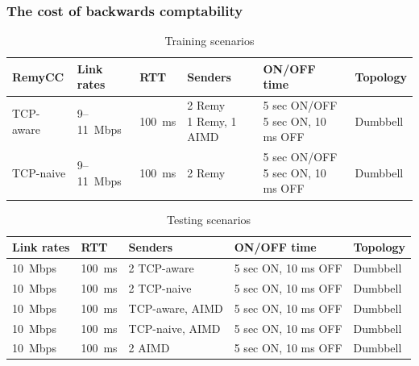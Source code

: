 \begin{frame}
\frametitle{The cost of backwards comptability}
\begin{table}
\begin{center}
\begin{tiny}
\begin{tabular}{l|l|l|l|l|l}
\bf RemyCC & \bf Link rates & \bf RTT & \bf Senders & ON/OFF time & Topology \\
\hline
TCP-aware  & 9--11~Mbps & 100~ms & \pbox{2.5cm}{2 Remy \\ 1 Remy, 1 AIMD}  & \pbox{2.5cm}{5 sec ON/OFF \\ 5 sec ON, 10 ms OFF} & Dumbbell\\
\hline
TCP-naive  & 9--11~Mbps & 100~ms & 2 Remy  & \pbox{2.5cm}{5 sec ON/OFF \\ 5 sec ON, 10 ms OFF} & Dumbbell\\
\hline
\end{tabular}
\end{tiny}
\caption{Training scenarios}
\label{table:oprange}
\end{center}
\end{table}

\begin{table}
\begin{center}
\begin{tiny}
\begin{tabular}{l|l|l|l|l}
\bf Link rates & \bf RTT & \bf Senders & ON/OFF time & Topology \\
\hline
10~Mbps & 100~ms & 2 TCP-aware & 5 sec ON, 10 ms OFF & Dumbbell\\
10~Mbps & 100~ms & 2 TCP-naive & 5 sec ON, 10 ms OFF & Dumbbell\\
10~Mbps & 100~ms & TCP-aware, AIMD & 5 sec ON, 10 ms OFF & Dumbbell\\
10~Mbps & 100~ms & TCP-naive, AIMD & 5 sec ON, 10 ms OFF & Dumbbell\\
10~Mbps & 100~ms & 2 AIMD  & 5 sec ON, 10 ms OFF & Dumbbell\\
\end{tabular}
\end{tiny}
\caption{Testing scenarios}
\label{table:oprange}
\end{center}
\end{table}

\end{frame}


